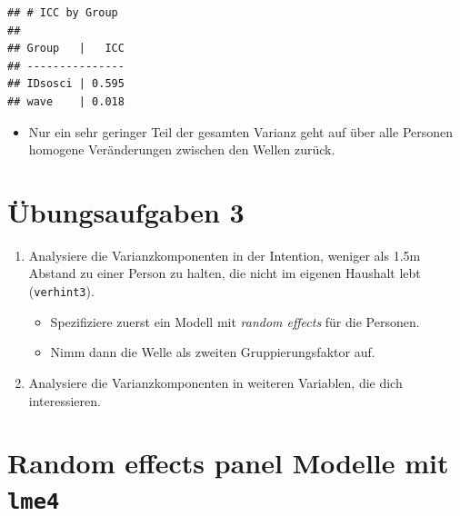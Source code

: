 \documentclass[
]{book}
\newenvironment{Shaded}{\begin{snugshade}}{\end{snugshade}}
\newcommand{\CommentTok}[1]{\textcolor[rgb]{0.56,0.35,0.01}{\textit{#1}}}
\newcommand{\DataTypeTok}[1]{\textcolor[rgb]{0.13,0.29,0.53}{#1}}
\newcommand{\DecValTok}[1]{\textcolor[rgb]{0.00,0.00,0.81}{#1}}
\newcommand{\KeywordTok}[1]{\textcolor[rgb]{0.13,0.29,0.53}{\textbf{#1}}}
\newcommand{\NormalTok}[1]{#1}
\newcommand{\OperatorTok}[1]{\textcolor[rgb]{0.81,0.36,0.00}{\textbf{#1}}}
\newcommand{\OtherTok}[1]{\textcolor[rgb]{0.56,0.35,0.01}{#1}}
\newcommand{\StringTok}[1]{\textcolor[rgb]{0.31,0.60,0.02}{#1}}
\providecommand{\tightlist}{%
  \setlength{\itemsep}{0pt}\setlength{\parskip}{0pt}}
\begin{document}
\begin{Shaded}
\end{Shaded}

\begin{verbatim}
## # ICC by Group
## 
## Group   |   ICC
## ---------------
## IDsosci | 0.595
## wave    | 0.018
\end{verbatim}

\begin{itemize}
\tightlist
\item
  Nur ein sehr geringer Teil der gesamten Varianz geht auf über alle Personen homogene Veränderungen zwischen den Wellen zurück.
\end{itemize}

\hypertarget{uxfcbungsaufgaben-3}{%
\section{Übungsaufgaben 3}\label{uxfcbungsaufgaben-3}}

\begin{enumerate}
\def\labelenumi{\arabic{enumi})}
\tightlist
\item
  Analysiere die Varianzkomponenten in der Intention, weniger als 1.5m Abstand zu einer Person zu halten, die nicht im eigenen Haushalt lebt (\texttt{verhint3}).

  \begin{itemize}
  \tightlist
  \item
    Spezifiziere zuerst ein Modell mit \emph{random effects} für die Personen.
  \item
    Nimm dann die Welle als zweiten Gruppierungsfaktor auf.
  \end{itemize}
\item
  Analysiere die Varianzkomponenten in weiteren Variablen, die dich interessieren.
\end{enumerate}

\hypertarget{random-effects-panel-modelle-mit-lme4}{%
\section{\texorpdfstring{Random effects panel Modelle mit \texttt{lme4}}{Random effects panel Modelle mit lme4}}\label{random-effects-panel-modelle-mit-lme4}}
\end{document}
